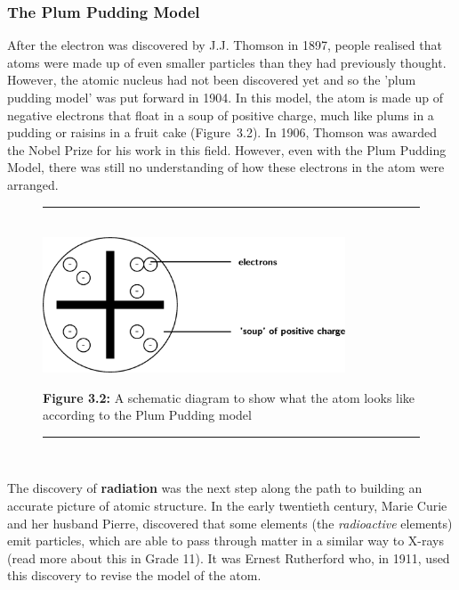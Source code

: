            \subsubsection{ The Plum Pudding Model}
            \nopagebreak
        \label{m38756*id254616}After the electron was discovered by J.J. Thomson in 1897, people realised that atoms were made up of even smaller particles than they had previously thought. However, the atomic nucleus had not been discovered yet and so the 'plum pudding model' was put forward in 1904. In this model, the atom is made up of negative electrons that float in a soup of positive charge, much like plums in a pudding or raisins in a fruit cake (Figure~3.2). In 1906, Thomson was awarded the Nobel Prize for his work in this field. However, even with the Plum Pudding Model, there was still no understanding of how these electrons in the atom were arranged.\par 
    \setcounter{subfigure}{0}
	\begin{figure}[H] %
    \begin{center}
    \rule[.1in]{\figurerulewidth}{.005in} \\
        \label{m38756*uid2!!!underscore!!!media}\label{m38756*uid2!!!underscore!!!printimage}\includegraphics[width=9cm]{col11305.imgs/m38756_CG10C3_001.png} %
      \vspace{2pt}
    \vspace{\rubberspace}\par \begin{cnxcaption}
	  \small \textbf{Figure 3.2: }A schematic diagram to show what the atom looks like according to the Plum Pudding model
	\end{cnxcaption}
    \vspace{.1in}
    \rule[.1in]{\figurerulewidth}{.005in} \\
    \end{center}
 \end{figure}       
        \label{m38756*id254642}The discovery of \textbf{radiation} was the next step along the path to building an accurate picture of atomic structure. In the early twentieth century, Marie Curie and her husband Pierre,  discovered that some elements (the \textsl{radioactive} elements) emit particles, which are able to pass through matter in a similar way to X-rays (read more about this in Grade 11). It was Ernest Rutherford who, in 1911, used this discovery to revise the model of the atom.\par 

